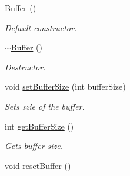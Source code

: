 \begin{DoxyCompactItemize}
\item 
\hypertarget{class_buffer_afd94276bbdae3a47c5d503403828db45}{}\hyperlink{class_buffer_afd94276bbdae3a47c5d503403828db45}{Buffer} ()\label{class_buffer_afd94276bbdae3a47c5d503403828db45}

\begin{DoxyCompactList}\small\item\em Default constructor. \end{DoxyCompactList}\item 
\hypertarget{class_buffer_a435522d5b0cb24abf26f26ec9082db4f}{}\hyperlink{class_buffer_a435522d5b0cb24abf26f26ec9082db4f}{$\sim$\+Buffer} ()\label{class_buffer_a435522d5b0cb24abf26f26ec9082db4f}

\begin{DoxyCompactList}\small\item\em Destructor. \end{DoxyCompactList}\item 
void \hyperlink{class_buffer_a9f2f069327c13089510fc94c69d3622e}{set\+Buffer\+Size} (int buffer\+Size)
\begin{DoxyCompactList}\small\item\em Sets szie of the buffer. \end{DoxyCompactList}\item 
int \hyperlink{class_buffer_a62438a4b345914d36de13f0679817ac0}{get\+Buffer\+Size} ()
\begin{DoxyCompactList}\small\item\em Gets buffer size. \end{DoxyCompactList}\item 
\hypertarget{class_buffer_acf39bb1a9f6ab53158e716d818089df3}{}void \hyperlink{class_buffer_acf39bb1a9f6ab53158e716d818089df3}{reset\+Buffer} ()\label{class_buffer_acf39bb1a9f6ab53158e716d818089df3}


\end{DoxyCompactItemize}
